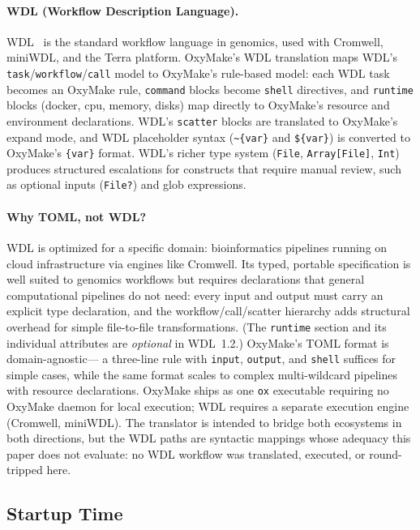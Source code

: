 \documentclass[12pt,a4paper]{article}
\newcommand{\code}[1]{{\texttt{\small\color{inlinecode}#1}}}
\begin{document}
\paragraph{WDL (Workflow Description Language).}
WDL~\cite{vossWDLCromwell2017} is the standard workflow language in genomics,
used with Cromwell, miniWDL, and the Terra platform. OxyMake's WDL translation
maps WDL's \code{task}/\code{workflow}/\code{call} model to OxyMake's rule-based
model: each WDL task becomes an OxyMake rule, \code{command} blocks become
\code{shell} directives, and \code{runtime} blocks (docker, cpu, memory, disks)
map directly to OxyMake's resource and environment declarations.  WDL's
\code{scatter} blocks are translated to OxyMake's expand mode, and WDL placeholder
syntax (\verb|~{var}| and \verb|${var}|) is converted to OxyMake's
\verb|{var}| format.  WDL's richer type system (\code{File}, \code{Array[File]},
\code{Int}) produces structured escalations for constructs that require manual
review, such as optional inputs (\code{File?}) and glob expressions.

\paragraph{Why TOML, not WDL?}
WDL is optimized for a specific domain: bioinformatics pipelines running on
cloud infrastructure via engines like Cromwell. Its typed, portable
specification is well suited to genomics workflows but requires
declarations that general computational pipelines do not need: every
input and
output must carry an explicit type declaration, and the
workflow/call/scatter hierarchy adds structural overhead for simple
file-to-file transformations. (The \code{runtime} section and its
individual attributes are \emph{optional} in WDL~1.2.) OxyMake's TOML
format is domain-agnostic---
a three-line rule with \code{input}, \code{output}, and \code{shell} suffices
for simple cases, while the same format scales to complex multi-wildcard
pipelines with resource declarations.  OxyMake ships as one \code{ox}
executable requiring no OxyMake daemon for local execution; WDL requires a separate
execution engine (Cromwell, miniWDL). The translator is intended to bridge
both ecosystems in both directions, but the WDL paths are syntactic
mappings whose adequacy this paper does not evaluate: no WDL workflow
was translated, executed, or round-tripped here.

\subsection{Startup Time}
\label{sec:startup-bench}
\end{document}
